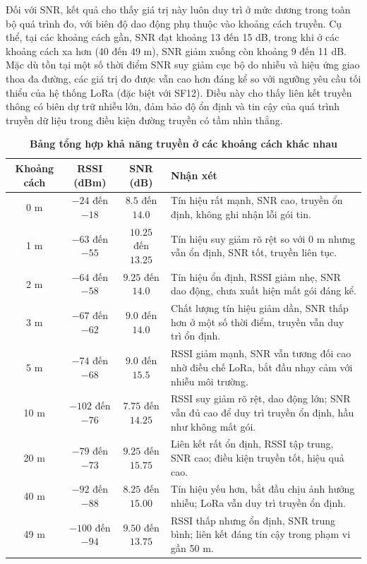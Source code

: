 \documentclass{article}
\begin{document}
	Đối với SNR, kết quả cho thấy giá trị này luôn duy trì ở mức dương trong toàn bộ quá trình đo, với biên độ dao động phụ thuộc vào khoảng cách truyền. Cụ thể, tại các khoảng cách gần, SNR đạt khoảng 13 đến 15 dB, trong khi ở các khoảng cách xa hơn (40 đến 49 m), SNR giảm xuống còn khoảng 9 đến 11 dB. Mặc dù tồn tại một số thời điểm SNR suy giảm cục bộ do nhiễu và hiệu ứng giao thoa đa đường, các giá trị đo được vẫn cao hơn đáng kể so với ngưỡng yêu cầu tối thiểu của hệ thống LoRa (đặc biệt với SF12). Điều này cho thấy liên kết truyền thông có biên dự trữ nhiễu lớn, đảm bảo độ ổn định và tin cậy của quá trình truyền dữ liệu trong điều kiện đường truyền có tầm nhìn thẳng.
	
	\begin{table}[H]
		\caption[Bảng tổng hợp khả năng truyền ở các khoảng cách khác nhau]{\bfseries \fontsize{12pt}{0pt}\selectfont Bảng tổng hợp khả năng truyền ở các khoảng cách khác nhau}
		\label{tab32}
		\centering
		\begin{tabular}{|c|c|c|p{6cm}|}
			\hline
			\textbf{Khoảng cách} & \textbf{RSSI (dBm)} & \textbf{SNR (dB)} & \textbf{Nhận xét} \\ \hline
			0 m  & $-24$ đến $-18$ & $8.5$ đến $14.0$ 
			& Tín hiệu rất mạnh, SNR cao, truyền ổn định, không ghi nhận lỗi gói tin. \\ \hline
			1 m  & $-63$ đến $-55$ & $10.25$ đến $13.25$ 
			& Tín hiệu suy giảm rõ rệt so với 0 m nhưng vẫn ổn định, SNR tốt, truyền liên tục. \\ \hline
			2 m  & $-64$ đến $-58$ & $9.25$ đến $14.0$ 
			& Tín hiệu ổn định, RSSI giảm nhẹ, SNR dao động, chưa xuất hiện mất gói đáng kể. \\ \hline
			3 m  & $-67$ đến $-62$ & $9.0$ đến $14.0$ 
			& Chất lượng tín hiệu giảm dần, SNR thấp hơn ở một số thời điểm, truyền vẫn duy trì ổn định. \\ \hline
			5 m  & $-74$ đến $-68$ & $9.0$ đến $15.5$ 
			& RSSI giảm mạnh, SNR vẫn tương đối cao nhờ điều chế LoRa, bắt đầu nhạy cảm với nhiễu môi trường. \\ \hline
			10 m & $-102$ đến $-76$ & $7.75$ đến $14.25$
			& RSSI suy giảm rõ rệt, dao động lớn; SNR vẫn đủ cao để duy trì truyền ổn định, hầu như không mất gói. \\ \hline
			20 m & $-79$ đến $-73$ & $9.25$ đến $15.75$
			& Liên kết rất ổn định, RSSI tập trung, SNR cao; điều kiện truyền tốt, hiệu quả cao. \\ \hline
			40 m & $-92$ đến $-88$ & $8.25$ đến $15.00$
			& Tín hiệu yếu hơn, bắt đầu chịu ảnh hưởng nhiễu; LoRa vẫn duy trì truyền ổn định. \\ \hline
			49 m & $-100$ đến $-94$ & $9.50$ đến $13.75$
			& RSSI thấp nhưng ổn định, SNR trung bình; liên kết đáng tin cậy trong phạm vi gần 50 m. \\ \hline
		\end{tabular}
	\end{table}
	
\end{document}

